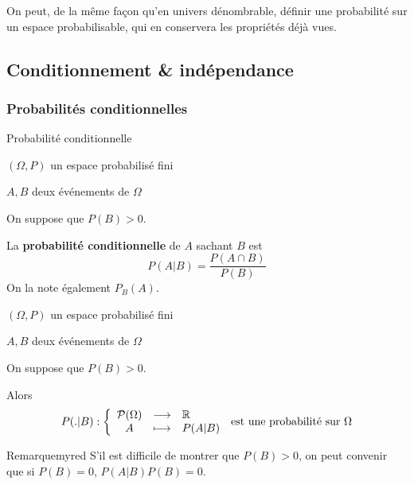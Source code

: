     On peut, de la même façon qu’en univers dénombrable, définir une probabilité sur un espace probabilisable, qui en conservera les propriétés déjà vues.

\subsection{Conditionnement \& indépendance}

    \subsubsection{Probabilités conditionnelles}

    \begin{defi}{Probabilité conditionnelle}{}
        \begin{soient}
            \item $(\Omega,P)$ un espace probabilisé fini
            \item $A,B$ deux événements de $\Omega$
        \end{soient}
        On suppose que $P(B) > 0$.

        La \textbf{probabilité conditionnelle} de $A$ sachant $B$ est \[ P(A | B) = \frac{P(A \cap B)}{P(B)} \]
        On la note également $P_B(A)$.
    \end{defi}

    \begin{theo}{}{}
        \begin{soient}
            \item $(\Omega,P)$ un espace probabilisé fini
            \item $A,B$ deux événements de $\Omega$
        \end{soient}
        On suppose que $P(B) > 0$.

        Alors 
        \[ \fonction{P(.|B)}{\mathcal{P}(\Omega)}{\mathbb{R}}{A}{P(A|B)} \text{ est une probabilité sur } \Omega \]
    \end{theo}

    \begin{omed}{Remarque}{myred}
        S’il est difficile de montrer que $P(B) > 0$, on peut convenir que si $P(B) = 0$, $P(A|B)P(B) = 0$.
    \end{omed}

